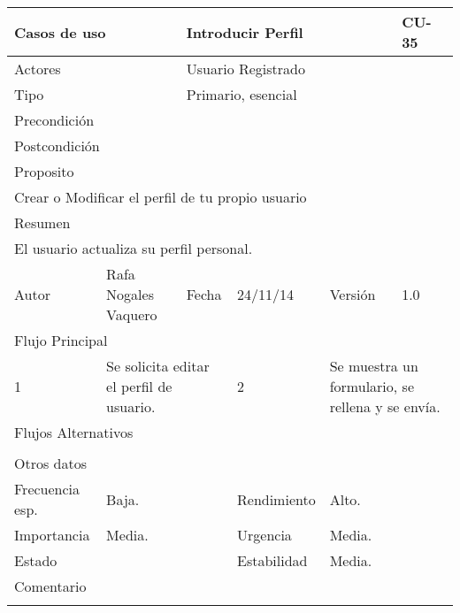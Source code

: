 \documentclass{article}
\begin{document}
\begin{table}[h]
\begin{tabular}{|l|l|l|l|l|l|}
\hline
\multicolumn{2}{|p{2cm}|}{Casos de uso}  & \multicolumn{3}{p{7cm}|}{Introducir Perfil} & CU-35 \\
\hline
\multicolumn{2}{|p{2cm}|}{Actores}       & \multicolumn{4}{p{8cm}|}{Usuario Registrado}        \\
\hline
\multicolumn{2}{|p{2cm}|}{Tipo}          & \multicolumn{4}{p{8cm}|}{Primario, esencial}        \\
\hline
\multicolumn{2}{|p{2cm}|}{Precondición}  & \multicolumn{4}{p{8cm}|}{}        \\
\hline
\multicolumn{2}{|p{2cm}|}{Postcondición} & \multicolumn{4}{p{8cm}|}{}        \\
\hline
\multicolumn{6}{|p{10cm}|}{Proposito}                                   \\
\hline
\multicolumn{6}{|p{10cm}|}{Crear o Modificar el perfil de tu propio usuario}                                            \\
\hline
\multicolumn{6}{|p{10cm}|}{Resumen}                                 \\
\hline
\multicolumn{6}{|p{10cm}|}{El usuario actualiza su perfil personal.}                                            \\
\hline
Autor         &       Rafa Nogales Vaquero        &  Fecha   &  24/11/14   &   Versión  & 1.0\\
\hline
\multicolumn{6}{|p{10cm}|}{Flujo Principal}\\
\hline
\multicolumn{1}{|p{1cm}|}{1} & \multicolumn{2}{p{3cm}}{Se solicita editar el perfil de usuario.} & \multicolumn{1}{|p{1cm}|}{2} & \multicolumn{2}{p{3cm}|}{Se muestra un formulario, se rellena y se envía.}\\
\hline
\multicolumn{6}{|p{10cm}|}{Flujos Alternativos}\\
\hline
\multicolumn{1}{|p{1cm}}{} & \multicolumn{5}{|p{9cm}|}{}\\
\hline
\multicolumn{6}{|p{10cm}|}{Otros datos}\\
\hline
\multicolumn{1}{|p{2cm}|}{Frecuencia esp.} & \multicolumn{2}{p{3cm}}{Baja.} & \multicolumn{1}{|p{2cm}|}{Rendimiento} & \multicolumn{2}{p{3cm}|}{Alto.}\\
\hline
\multicolumn{1}{|p{2cm}|}{Importancia} & \multicolumn{2}{p{3cm}}{Media.} & \multicolumn{1}{|p{2cm}|}{Urgencia} & \multicolumn{2}{p{3cm}|}{Media.}\\
\hline
\multicolumn{1}{|p{2cm}|}{Estado} & \multicolumn{2}{p{3cm}}{} & \multicolumn{1}{|p{2cm}|}{Estabilidad} & \multicolumn{2}{p{3cm}|}{Media.}\\
\hline
\multicolumn{6}{|p{10cm}|}{Comentario}\\
\hline
\multicolumn{6}{|p{10cm}|}{}\\
\hline
\end{tabular}
\end{table}
\end{document}
